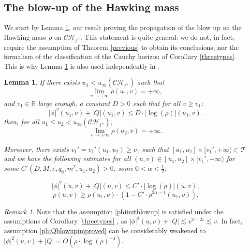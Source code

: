 \documentclass[10pt,a4paper]{article}
\theoremstyle{plain}
\newtheorem{lem}[thm]{Lemma}
\theoremstyle{remark}
\newtheorem{rmk}{Remark}[section]
\theoremstyle{definition}
\newcommand{\RR}{\mathbb{R}}
\theoremstyle{plain}
\theoremstyle{remark}
\theoremstyle{definition}
\newcommand{\CH}{\mathcal{CH}_{i^+}}
\numberwithin{equation}{section}
\begin{document}
\subsection{The blow-up of the Hawking mass}  \label{propagationsection}
We start by Lemma \ref{massblowuplemma}, our result proving the propagation of the blow up on the Hawking mass $\rho$ on $\CH$. This statement is quite general: we do not, in fact, require the assumption of Theorem \ref{previous} to obtain its conclusions, nor the formalism of the classification of the Cauchy horizon of Corollary \ref{threetypes}. This is why Lemma \ref{massblowuplemma} is also used independently in \cite{r=0}.

\begin{lem} \label{massblowuplemma}
	If there exists $u_1 < u_{\infty}(\CH)$ such that $$ \lim_{v \rightarrow +\infty} \rho(u_1,v)=+\infty,$$ and $v_1 \in \RR$ large enough, a constant $D>0$ such that for all $v \geq v_1$: \begin{equation} \label{phiinitblowup}
	|\phi|^2(u_1,v)+ |Q|(u_1,v) \leq D \cdot |\log(\rho)|(u_1,v).
	\end{equation} 
	then, for all $ u_1 \leq u_2 < u_{\infty}(\CH)$, $$ \lim_{v \rightarrow +\infty} \rho(u_2,v)=+\infty.$$
	
	Moreover, there exists $v_1'=v_1'(u_1,u_2) \geq v_1$ such that $[u_1,u_2] \times [v_1',+\infty) \subset \mathcal{T}$ and we have the following estimates for all $(u,v) \in [u_1,u_2] \times [v_1',+\infty)$ for some $C'(D,M,e,q_0,m^2,u_1,u_2)>0$, some  $0<\alpha<\frac{1}{2}$:
	
	\begin{equation} \label{phiQblowupimproved}
	|\phi|^2(u,v)+ |Q|(u,v) \leq C' \cdot |\log(\rho)|(u,v), 
	\end{equation} 
	\begin{equation} \label{massblowupest}
	\rho(u,v) \geq \rho(u_1,v) \cdot (1-C' \cdot \rho^{2\alpha-1}(u_1,v)).
	\end{equation}
	
	
	
	
	
	
	
	
\end{lem}
\begin{rmk}
	Note that the assumption \eqref{phiinitblowup} is satisfied under the assumptions of Corollary \ref{threetypes} , as $|\phi|^2(u,v)+ |Q| \lesssim v^{2-2s} \lesssim v$. In fact, assumption \eqref{phiQblowupimproved} can be considerably weakened to  $|\phi|^2(u,v)+ |Q| = O( \rho \cdot \log(\rho)^{-1})$.
\end{rmk}
\end{document}
